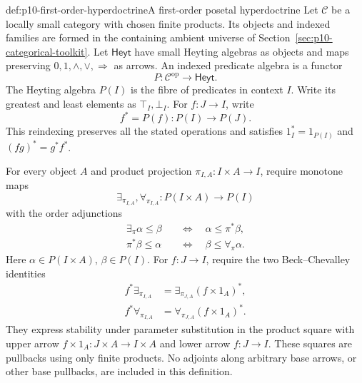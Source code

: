 \begin{hbdefinition}{def:p10-first-order-hyperdoctrine}{A first-order posetal hyperdoctrine}
Let \(\mathcal C\) be a locally small category with chosen finite
products.  Its objects and indexed families are formed in the
containing ambient universe of
Section~\ref{sec:p10-categorical-toolkit}.
Let \(\mathsf{Heyt}\) have small Heyting algebras as objects and
maps preserving \(0,1,\wedge,\vee,\Rightarrow\) as arrows.
An indexed predicate algebra is a functor
\[
                       P:\mathcal C^{\mathrm{op}}\longrightarrow
                         \mathsf{Heyt}.
\]
The Heyting algebra \(P(I)\) is the fibre of predicates in context
\(I\).  Write its greatest and least elements as
\(\top_I,\bot_I\).
For \(f:J\to I\), write
\[
                    f^*=P(f):P(I)\longrightarrow P(J).
\]
This reindexing preserves all the stated operations and satisfies
\(1_I^*=1_{P(I)}\) and \((f g)^*=g^*f^*\).

For every object \(A\) and product projection
\(\pi_{I,A}:I\times A\to I\), require monotone maps
\[
        \exists_{\pi_{I,A}},\forall_{\pi_{I,A}}:
                    P(I\times A)\longrightarrow P(I)
\]
with the order adjunctions
\[
 \begin{aligned}
 \exists_\pi\alpha\leq\beta
       &\quad\Longleftrightarrow\quad\alpha\leq\pi^*\beta,\\
 \pi^*\beta\leq\alpha
       &\quad\Longleftrightarrow\quad\beta\leq\forall_\pi\alpha.
 \end{aligned}
\]
Here \(\alpha\in P(I\times A)\), \(\beta\in P(I)\).
For \(f:J\to I\), require the two Beck--Chevalley identities
\[
 \begin{aligned}
 f^*\exists_{\pi_{I,A}}
     &=\exists_{\pi_{J,A}}(f\times1_A)^*,\\
 f^*\forall_{\pi_{I,A}}
     &=\forall_{\pi_{J,A}}(f\times1_A)^*.
 \end{aligned}
\]
They express stability under parameter substitution in the product
square with upper arrow \(f\times1_A:J\times A\to I\times A\)
and lower arrow \(f:J\to I\).
These squares are pullbacks using only finite products.
No adjoints along arbitrary base arrows, or other base pullbacks,
are included in this definition.
\end{hbdefinition}

